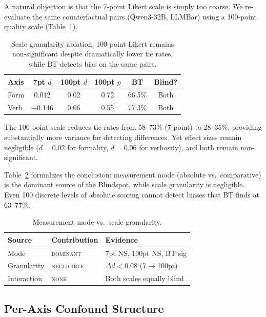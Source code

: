 \documentclass[11pt,twocolumn]{article}
\begin{document}
A natural objection is that the 7-point Likert scale is simply too coarse. We re-evaluate the same counterfactual pairs (Qwen3-32B, LLMBar) using a 100-point quality scale (Table~\ref{tab:100pt}).

\begin{table}[t]
\centering
\small
\caption{Scale granularity ablation. 100-point Likert remains non-significant despite dramatically lower tie rates, while BT detects bias on the same pairs.}
\label{tab:100pt}
\begin{tabular}{@{}lccccc@{}}
\toprule
Axis & 7pt $d$ & 100pt $d$ & 100pt $p$ & BT & Blind? \\
\midrule
Form & 0.012 & 0.02 & 0.72 & 66.5\% & Both \\
Verb & $-$0.146 & 0.06 & 0.55 & 77.3\% & Both \\
\bottomrule
\end{tabular}
\vspace{-2mm}
\end{table}

The 100-point scale reduces tie rates from 58--73\% (7-point) to 28--35\%, providing substantially more variance for detecting differences. Yet effect sizes remain negligible ($d = 0.02$ for formality, $d = 0.06$ for verbosity), and both remain non-significant.

Table~\ref{tab:mode_vs_gran} formalizes the conclusion: measurement mode (absolute vs.\ comparative) is the dominant source of the Blindspot, while scale granularity is negligible. Even 100 discrete levels of absolute scoring cannot detect biases that BT finds at 63--77\%.

\begin{table}[t]
\centering
\small
\caption{Measurement mode vs.\ scale granularity.}
\label{tab:mode_vs_gran}
\begin{tabular}{@{}lll@{}}
\toprule
Source & Contribution & Evidence \\
\midrule
Mode & \textsc{dominant} & 7pt NS, 100pt NS, BT sig \\
Granularity & \textsc{negligible} & $\Delta d < 0.08$ (7$\to$100pt) \\
Interaction & \textsc{none} & Both scales equally blind \\
\bottomrule
\end{tabular}
\vspace{-2mm}
\end{table}

\subsection{Per-Axis Confound Structure}
\label{sec:confound}
\end{document}
